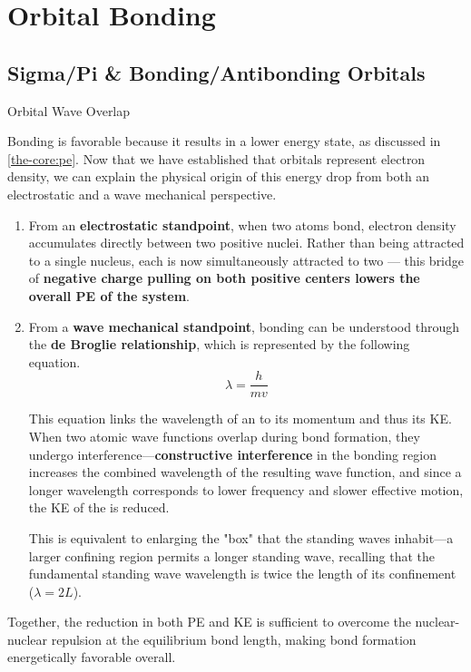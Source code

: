 \documentclass[10pt]{article}
\begin{document}
\section{Orbital Bonding}
  
  \subsection{Sigma/Pi \& Bonding/Antibonding Orbitals}

    \begin{core}{Orbital Wave Overlap}

      Bonding is favorable because it results in a lower energy state, as discussed in \autoref{the-core:pe}. Now that we have established that orbitals represent electron density, we can explain the physical origin of this energy drop from both an electrostatic and a wave mechanical perspective.

      \begin{enumerate}

        \item From an \textbf{electrostatic standpoint}, when two atoms bond, electron density accumulates directly between two positive nuclei. Rather than being attracted to a single nucleus, each  is now simultaneously attracted to two — this bridge of \textbf{negative charge pulling on both positive centers lowers the overall PE of the system}.

        \item From a \textbf{wave mechanical standpoint}, bonding can be understood through the \textbf{de Broglie relationship}, which is represented by the following equation.
        \[
          λ = \frac{h}{mv}
        \]

        This equation links the wavelength of an  to its momentum and thus its KE. When two atomic wave functions overlap during bond formation, they undergo interference---\textbf{constructive interference} in the bonding region increases the combined wavelength of the resulting wave function, and since a longer wavelength corresponds to lower frequency and slower effective motion, the KE of the  is reduced.


        This is equivalent to enlarging the "box" that the  standing waves inhabit---a larger confining region permits a longer standing wave, recalling that the fundamental standing wave wavelength is twice the length of its confinement ($λ = 2L$).


      \end{enumerate}

      Together, the reduction in both PE and KE is sufficient to overcome the nuclear-nuclear repulsion at the equilibrium bond length, making bond formation energetically favorable overall.

    \end{core}
\end{document}
